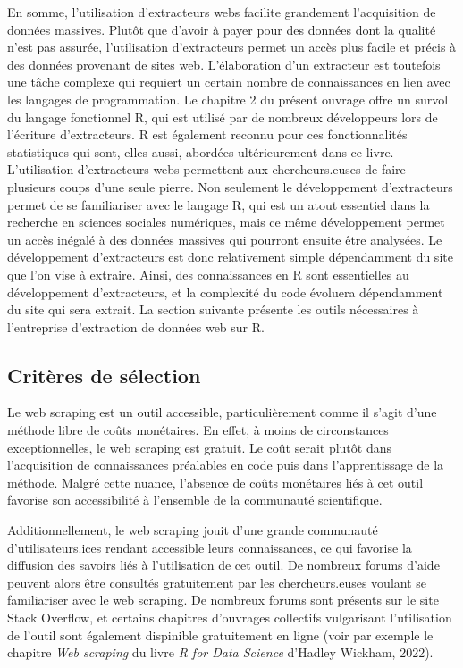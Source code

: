 \documentclass[
  letterpaper,
  DIV=11,
  numbers=noendperiod]{scrreprt}
\begin{document}
En somme, l'utilisation d'extracteurs webs facilite grandement
l'acquisition de données massives. Plutôt que d'avoir à payer pour des
données dont la qualité n'est pas assurée, l'utilisation d'extracteurs
permet un accès plus facile et précis à des données provenant de sites
web. L'élaboration d'un extracteur est toutefois une tâche complexe qui
requiert un certain nombre de connaissances en lien avec les langages de
programmation. Le chapitre 2 du présent ouvrage offre un survol du
langage fonctionnel R, qui est utilisé par de nombreux développeurs lors
de l'écriture d'extracteurs. R est également reconnu pour ces
fonctionnalités statistiques qui sont, elles aussi, abordées
ultérieurement dans ce livre. L'utilisation d'extracteurs webs
permettent aux chercheurs.euses de faire plusieurs coups d'une seule
pierre. Non seulement le développement d'extracteurs permet de se
familiariser avec le langage R, qui est un atout essentiel dans la
recherche en sciences sociales numériques, mais ce même développement
permet un accès inégalé à des données massives qui pourront ensuite être
analysées. Le développement d'extracteurs est donc relativement simple
dépendamment du site que l'on vise à extraire. Ainsi, des connaissances
en R sont essentielles au développement d'extracteurs, et la complexité
du code évoluera dépendamment du site qui sera extrait. La section
suivante présente les outils nécessaires à l'entreprise d'extraction de
données web sur R.

\hypertarget{crituxe8res-de-suxe9lection-1}{%
\subsection{Critères de sélection}\label{crituxe8res-de-suxe9lection-1}}

Le web scraping est un outil accessible, particulièrement comme il
s'agit d'une méthode libre de coûts monétaires. En effet, à moins de
circonstances exceptionnelles, le web scraping est gratuit. Le coût
serait plutôt dans l'acquisition de connaissances préalables en code
puis dans l'apprentissage de la méthode. Malgré cette nuance, l'absence
de coûts monétaires liés à cet outil favorise son accessibilité à
l'ensemble de la communauté scientifique.

Additionnellement, le web scraping jouit d'une grande communauté
d'utilisateurs.ices rendant accessible leurs connaissances, ce qui
favorise la diffusion des savoirs liés à l'utilisation de cet outil. De
nombreux forums d'aide peuvent alors être consultés gratuitement par les
chercheurs.euses voulant se familiariser avec le web scraping. De
nombreux forums sont présents sur le site Stack Overflow, et certains
chapitres d'ouvrages collectifs vulgarisant l'utilisation de l'outil
sont également dispinible gratuitement en ligne (voir par exemple le
chapitre \emph{Web scraping} du livre \emph{R for Data Science} d'Hadley
Wickham, 2022).
\end{document}
